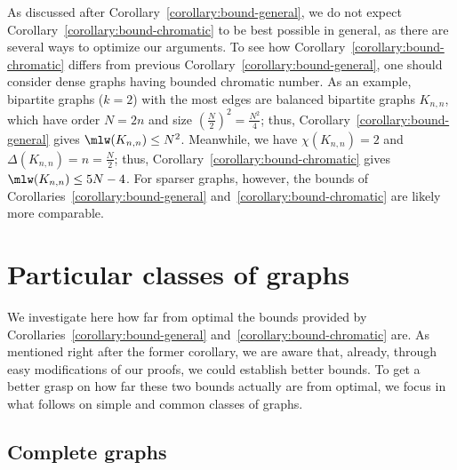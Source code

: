 \documentclass[a4paper,11pt,dvipsnames]{elsarticle}
\begin{document}
As discussed after Corollary~\ref{corollary:bound-general}, we do not expect Corollary~\ref{corollary:bound-chromatic} to be best possible in general, as there are several ways to optimize our arguments. To see how Corollary~\ref{corollary:bound-chromatic} differs from previous Corollary~\ref{corollary:bound-general}, one should consider dense graphs
having bounded chromatic number. As an example, bipartite graphs ($k=2$) with the most edges are balanced bipartite graphs $K_{n,n}$, which have order $N=2n$ and size $\left(\frac{N}{2}\right)^2=\frac{N^2}{4}$; thus, Corollary~\ref{corollary:bound-general} gives $\mlw(K_{n,n}) \leq N^2$. Meanwhile, we have $\chi(K_{n,n})=2$ and $\Delta(K_{n,n})=n=\frac{N}{2}$; thus, Corollary~\ref{corollary:bound-chromatic} gives $\mlw(K_{n,n}) \leq 5N-4$. For sparser graphs, however, the bounds of Corollaries~\ref{corollary:bound-general} and~\ref{corollary:bound-chromatic} are likely more comparable. 




\section{Particular classes of graphs}\label{section:particular-classes}

We investigate here how far from optimal the bounds provided by Corollaries~\ref{corollary:bound-general} and~\ref{corollary:bound-chromatic} are. As mentioned right after the former corollary,
we are aware that, already, through easy modifications of our proofs, we could establish better bounds. To get a better grasp on how far these two bounds actually are from optimal, we focus in what follows on simple and common classes of graphs.

\subsection{Complete graphs}
\end{document}
